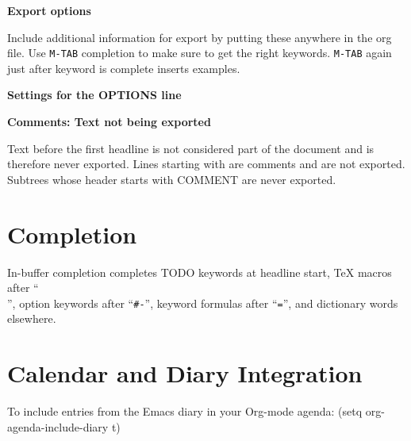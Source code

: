 {\bf Export options}

Include additional information for export by putting these anywhere in the
org file.  Use {\tt M-TAB} completion to make sure to get the right
keywords. {\tt M-TAB} again just after keyword is complete inserts examples.


{\bf Settings for the OPTIONS line}


{\bf Comments: Text not being exported}

Text before the first headline is not considered part of the document
and is therefore never exported.
Lines starting with \kbd{\#} are comments and are not exported.
Subtrees whose header starts with COMMENT are never exported.


\section{Completion}

In-buffer completion completes TODO keywords at headline start, TeX
macros after ``{\tt \\}'', option keywords after ``{\tt \#-}'',
keyword formulas after ``{\tt =}'', and dictionary words elsewhere.


\newcolumn

\section{Calendar and Diary Integration}

To include entries from the Emacs diary in your Org-mode agenda:
\beginexample%
(setq org-agenda-include-diary t)
\endexample

